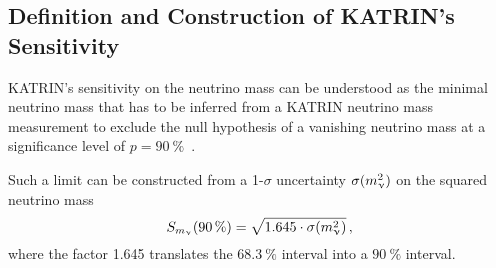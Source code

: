 \subsection{Definition and Construction of KATRIN's Sensitivity}
\label{sec:statMethodsSensitivtyDef}
KATRIN's sensitivity on the neutrino mass can be understood as the minimal neutrino mass that has to be inferred from a KATRIN neutrino mass measurement to exclude the null hypothesis of a vanishing neutrino mass at a significance level of $p=\SI{90}{\percent}$~\cite{Kleesiek2014,Angrik:2005ep}.

Such a limit can be constructed from a 1-$\sigma$ uncertainty $\sigma(m_\upnu^2)$ on the squared neutrino mass~\cite{Kleesiek2014,Angrik:2005ep}
\begin{equation}
	\label{eq:statMethodsSensitivity}
	S_{m_\upnu}(\SI{90}{\percent}) = \sqrt{1.645\cdot\sigma(m_\upnu^2)}
	\text{\,,}
\end{equation}
where the factor 1.645 translates the $\SI{68.3}{\percent}$ interval into a $\SI{90}{\percent}$ interval.

